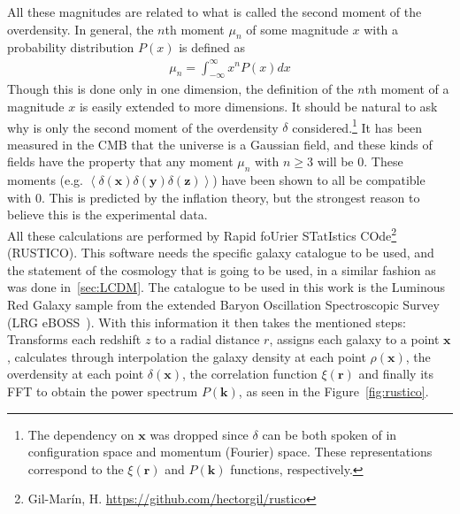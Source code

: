 All these magnitudes are related to what is called the second moment of the overdensity. In general, the $n$th moment $\mu_n$ of some magnitude $x$ with a probability distribution $P(x)$ is defined as 
\begin{align}
	\mu_n = \int_{-\infty}^{\infty} x^{n}P(x)dx 
	\label{eq:n-moment}
\end{align}
Though this is done only in one dimension, the definition of the $n$th moment of a magnitude $x$ is easily extended to more dimensions.
It should be natural to ask why is only the second moment of the overdensity $\delta$ considered.\footnote{The dependency on $\textbf{x}$ was dropped since $\delta$ can be both spoken of in configuration space and momentum (Fourier) space. These representations correspond to the $\xi(\textbf{r})$ and $P(\textbf{k})$ functions, respectively.}
It has been measured in the CMB that the universe is a Gaussian field, and these kinds of fields have the property that any moment $\mu_n$ with $n\ge3$ will be 0. These moments (e.g. $ \left<\delta(\textbf{x}) \delta(\textbf{y}) \delta(\textbf{z}) \right>$) have been shown to all be compatible with 0. This is predicted by the inflation theory, but the strongest reason to believe this is the experimental data. \\

All these calculations are performed by Rapid foUrier STatIstics COde\footnote{Gil-Marín, H. \url{https://github.com/hectorgil/rustico}} (RUSTICO). This software needs the specific galaxy catalogue to be used, and the statement of the cosmology that is going to be used, in a similar fashion as was done in~\ref{sec:LCDM}. The catalogue to be used in this work is the Luminous Red Galaxy sample from the extended Baryon Oscillation Spectroscopic Survey (LRG eBOSS~\cite{eBoss}).
With this information it then takes the mentioned steps: Transforms each redshift $z$ to a radial distance $r$, assigns each galaxy to a point $\textbf{x}$, calculates through interpolation the galaxy density at each point $\rho\left(  \textbf{x}\right)$, the overdensity at each point $\delta\left( \textbf{x} \right)$, the correlation function $\xi(\textbf{r})$ and finally its FFT to obtain the power spectrum $P(\textbf{k})$, as seen in the Figure~\ref{fig:rustico}. \\


